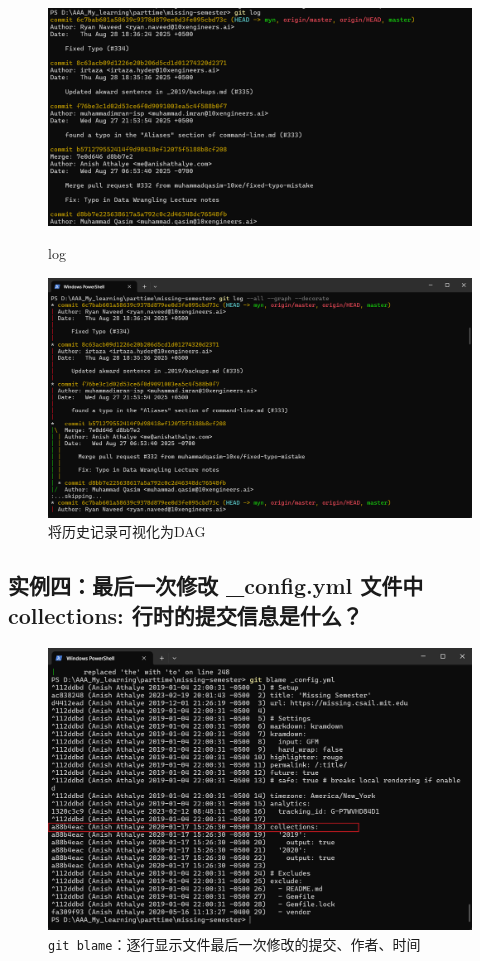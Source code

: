\documentclass[a4paper]{article}
\begin{document}
    \begin{figure}[H]
    \centering
    \includegraphics[width=1\textwidth]{images/log.png}
    \caption{log}
    \label{log}
    \vspace{1cm}
    \includegraphics[width=1\textwidth]{images/log2.png}
    \caption{将历史记录可视化为DAG}

    \end{figure}

   

\subsection{实例四：最后一次修改 \_config.yml 文件中 collections: 行时的提交信息是什么？}

\begin{figure}[H]
    \centering
    \includegraphics[width=1\textwidth]{images/blame.png}
    \caption{\texttt{git blame}：逐行显示文件最后一次修改的提交、作者、时间}
    \end{figure}
    \vspace{1cm}
\end{document}
